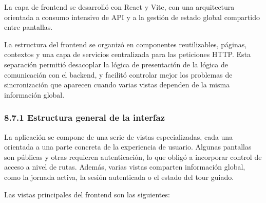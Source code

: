 La capa de frontend se desarrolló con React y Vite, con una arquitectura orientada a consumo intensivo de API y a la gestión de estado global compartido entre pantallas.

La estructura del frontend se organizó en componentes reutilizables, páginas, contextos y una capa de servicios centralizada para las peticiones HTTP. 
Esta separación permitió desacoplar la lógica de presentación de la lógica de comunicación con el backend, y facilitó controlar mejor los problemas de 
sincronización que aparecen cuando varias vistas dependen de la misma información global.

\subsubsection{8.7.1 Estructura general de la interfaz}

La aplicación se compone de una serie de vistas especializadas, cada una orientada a una parte concreta de la experiencia de usuario. 
Algunas pantallas son públicas y otras requieren autenticación, lo que obligó a incorporar control de acceso a nivel de rutas. Además, varias vistas
 comparten información global, como la jornada activa, la sesión autenticada o el estado del tour guiado.

Las vistas principales del frontend son las siguientes:

